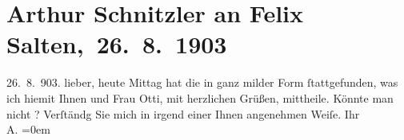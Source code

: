 

         
         \renewcommand{\erwaehntePersonen}{Personen: Felix Salten, Ottilie Salten}
         \renewcommand{\erwaehnteOrte}{Orte: Wien}
         \renewcommand{\erwaehnteWerke}{}
               \section[ Arthur Schnitzler an Felix Salten, 26. 8. 1903]{ Arthur Schnitzler an Felix Salten, 26. 8. 1903}\nopagebreak{}\rehead{ }\begin{ledgroupsized}[t]{13cm}\normalsize\beginnumbering{} \toendnotes[C]{\smallbreak\pagebreak[2]} 
\toendnotes[C]{\smallbreak}\pstart
           \raggedleft{}{\pb}26. 8. 903.\pend
           \pstart
           lieber,{ }heute{ }Mittag hat die \label{K_L02983-1v}\label{K_L02983-1h} in ganz milder Form ſtattgefunden, was ich hiemit Ihnen und Frau Otti, mit herzlichen Grüßen, mittheile.\pend
           \pstart
           {\pb}Könnte man nicht \label{K_L02983-2v}\label{K_L02983-2h}?
                  Verſtändg Sie mich in irgend einer Ihnen angenehmen
               Weiſe.\pend
           \pstart
           Ihr {\\[\baselineskip]}\spacefill\mbox{A.}\pend
           \leftskip=0em{}
         
         \endnumbering{}\end{ledgroupsized}  \newcommand{\dateiname}{L02983}\newcommand{\titel}{Arthur Schnitzler an Felix Salten, 26. 8. 1903}\newcommand{\editorInnen}{Martin Anton Müller und Laura Untner}
      